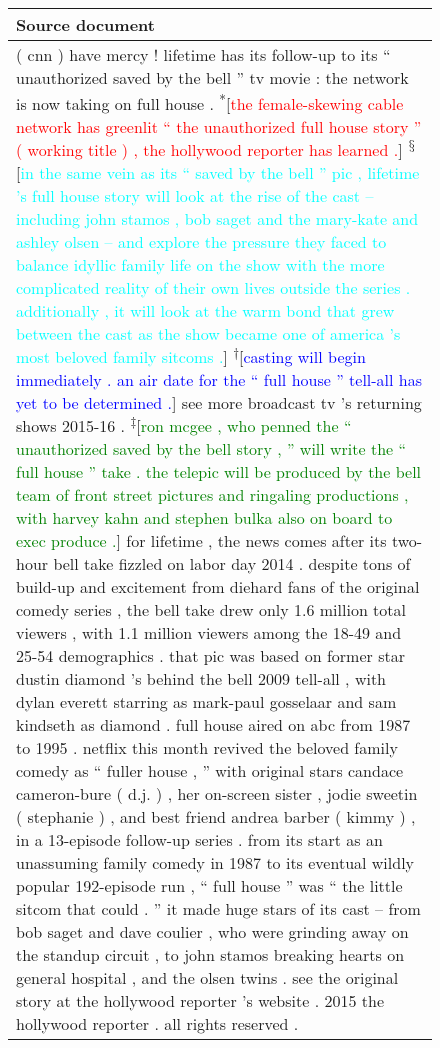 \documentclass[11pt,a4paper]{article}
\begin{document}
\begin{figure*}[t]
\centering
\begin{tabular*}{\textwidth}{| p{} | }
  \hline
  \textbf{Source document} \\ \hline
        ( cnn ) have mercy ! lifetime has its follow-up to its `` unauthorized saved by the bell '' tv movie : the network is now taking on full house .
        \textsuperscript{*}[\textcolor{red}{the female-skewing cable network has greenlit `` the unauthorized full house story '' ( working title ) , the hollywood reporter has learned .}]
        \textsuperscript{$\mathsection$}[\textcolor{cyan}{in the same vein as its `` saved by the bell '' pic , lifetime 's full house story will look at the rise of the cast -- including john stamos , bob saget and the mary-kate and ashley olsen -- and explore the pressure they faced to balance idyllic family life on the show with the more complicated reality of their own lives outside the series . additionally , it will look at the warm bond that grew between the cast as the show became one of america 's most beloved family sitcoms .}]
        \textsuperscript{$\dagger$}[\textcolor{blue}{casting will begin immediately . an air date for the `` full house '' tell-all has yet to be determined .}]
        see more broadcast tv 's returning shows 2015-16 .
        \textsuperscript{$\ddagger$}[\textcolor{green}{ron mcgee , who penned the `` unauthorized saved by the bell story , '' will write the `` full house '' take . the telepic will be produced by the bell team of front street pictures and ringaling productions , with harvey kahn and stephen bulka also on board to exec produce .}]
        for lifetime , the news comes after its two-hour bell take fizzled on labor day 2014 . despite tons of build-up and excitement from diehard fans of the original comedy series , the bell take drew only 1.6 million total viewers , with 1.1 million viewers among the 18-49 and 25-54 demographics . that pic was based on former star dustin diamond 's behind the bell 2009 tell-all , with dylan everett starring as mark-paul gosselaar and sam kindseth as diamond .
        full house aired on abc from 1987 to 1995 . netflix this month revived the beloved family comedy as `` fuller house , '' with original stars candace cameron-bure ( d.j. ) , her on-screen sister , jodie sweetin ( stephanie ) , and best friend andrea barber ( kimmy ) , in a 13-episode follow-up series .
        from its start as an unassuming family comedy in 1987 to its eventual wildly popular 192-episode run , `` full house '' was `` the little sitcom that could . '' it made huge stars of its cast -- from bob saget and dave coulier , who were grinding away on the standup circuit , to john stamos breaking hearts on general hospital , and the olsen twins .
        see the original story at the hollywood reporter 's website .
        2015 the hollywood reporter . all rights reserved .



\end{tabular*}
\end{figure*}
\end{document}
